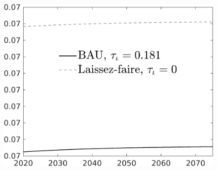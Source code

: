\documentclass[12pt]{article}
\begin{document}
\begin{figure}[h!!]
\begin{minipage}[]{0.32\textwidth}
	\end{minipage}	
	\begin{minipage}[]{0.32\textwidth}
		\includegraphics[width=1\textwidth]{../../codding_model/own_basedOnFried/optimalPol_010922_revision/figures/all_13Sept22/CompTaul_Equlab_LFBAU_Reg0_GFF_spillover0_nsk0_xgr1_knspil1_sep1_countec0_GovRev0_etaa0.79_lgd1.png}
	\end{minipage}	
\end{figure}
\end{document}
